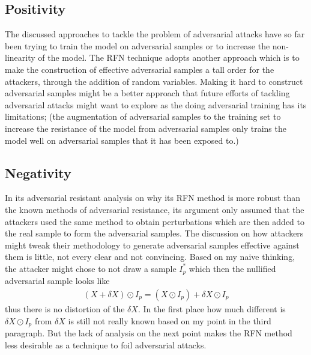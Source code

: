 \documentclass[a4paper,10pt]{article}
\theoremstyle{definition}
\begin{document}
\subsection*{Positivity}
The discussed approaches to tackle the problem of adversarial attacks have so far been trying to train the model on adversarial samples or to increase the non-linearity of the model. The RFN technique adopts another approach which is to make the construction of effective adversarial samples a tall order for the attackers, through the addition of random variables. Making it hard to construct adversarial samples might be a better approach that future efforts of tackling adversarial attacks might want to explore as the doing adversarial training has its limitations; (the augmentation of adversarial samples to the training set to increase the resistance of the model from adversarial samples only trains the model well on adversarial samples that it has been exposed to.)





%


\subsection*{Negativity}

In its adversarial resistant analysis on why its RFN method is more robust than the known methods of adversarial resistance, its argument only assumed that the attackers used the same method to obtain perturbations which are then added to the real sample to form the adversarial samples. The discussion on how attackers might tweak their methodology to generate adversarial samples effective against them is little, not every clear and not convincing. Based on my naive thinking, the attacker might chose to not draw a sample $I_p^\ast$ which then the nullified adversarial sample looks like
\begin{align*}
(X+\delta X ) \odot I_p = (X \odot I_p) + \delta X\odot I_p
\end{align*}
thus there is no distortion of the $\delta X$. In the first place how much different is $\delta X \odot I_p$ from $\delta X$ is still not really known based on my point in the third paragraph. But the lack of analysis on the next point makes the RFN method less desirable as a technique to foil adversarial attacks.
\end{document}
